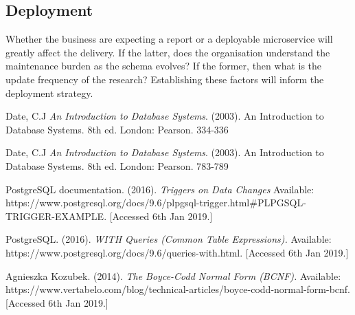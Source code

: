 \documentclass[12pt]{article}
\begin{document}
\subsection{Deployment}
Whether the business are expecting a report or a deployable microservice will greatly affect the delivery. If the latter, does the organisation understand the maintenance burden as the schema evolves? If the former, then what is the update frequency of the research? Establishing these factors will inform the deployment strategy.
\begin{thebibliography}{9}

Date, C.J
\textit{An Introduction to Database Systems}.
(2003). An Introduction to Database Systems. 8th ed. London: Pearson. 334-336

Date, C.J
\textit{An Introduction to Database Systems}.
(2003). An Introduction to Database Systems. 8th ed. London: Pearson. 783-789

PostgreSQL documentation. (2016).
\textit{Triggers on Data Changes}
 Available: https://www.postgresql.org/docs/9.6/plpgsql-trigger.html#PLPGSQL-TRIGGER-EXAMPLE. [Accessed 6th Jan 2019.]

PostgreSQL. (2016). \textit{WITH Queries (Common Table Expressions).} Available: https://www.postgresql.org/docs/9.6/queries-with.html. [Accessed 6th Jan 2019.]

Agnieszka Kozubek. (2014). \textit{The Boyce-Codd Normal Form (BCNF).} Available: https://www.vertabelo.com/blog/technical-articles/boyce-codd-normal-form-bcnf. [Accessed 6th Jan 2019.]


\end{thebibliography}
\end{document}
